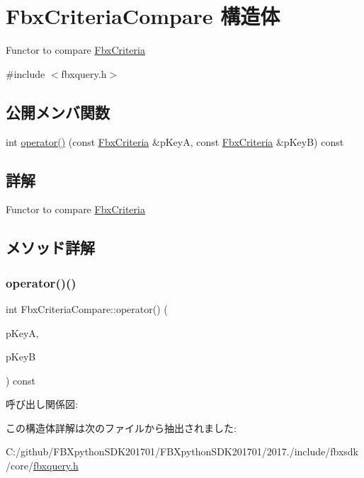 \hypertarget{struct_fbx_criteria_compare}{}\section{Fbx\+Criteria\+Compare 構造体}
\label{struct_fbx_criteria_compare}


Functor to compare \hyperlink{class_fbx_criteria}{Fbx\+Criteria}  




{\ttfamily \#include $<$fbxquery.\+h$>$}

\subsection*{公開メンバ関数}
\begin{DoxyCompactItemize}
\item 
int \hyperlink{struct_fbx_criteria_compare_aa3ea695d11ec64d35f522007960f42b5}{operator()} (const \hyperlink{class_fbx_criteria}{Fbx\+Criteria} \&p\+KeyA, const \hyperlink{class_fbx_criteria}{Fbx\+Criteria} \&p\+KeyB) const
\end{DoxyCompactItemize}


\subsection{詳解}
Functor to compare \hyperlink{class_fbx_criteria}{Fbx\+Criteria} 

\subsection{メソッド詳解}
\mbox{\label{struct_fbx_criteria_compare_aa3ea695d11ec64d35f522007960f42b5}} 
\subsubsection{\texorpdfstring{operator()()}{operator()()}}
{\footnotesize\ttfamily int Fbx\+Criteria\+Compare\+::operator() (\begin{DoxyParamCaption}\item[{const \hyperlink{class_fbx_criteria}{Fbx\+Criteria} \&}]{p\+KeyA,  }\item[{const \hyperlink{class_fbx_criteria}{Fbx\+Criteria} \&}]{p\+KeyB }\end{DoxyParamCaption}) const}

呼び出し関係図\+:


この構造体詳解は次のファイルから抽出されました\+:\begin{DoxyCompactItemize}
\item 
C\+:/github/\+F\+B\+Xpython\+S\+D\+K201701/\+F\+B\+Xpython\+S\+D\+K201701/2017./include/fbxsdk/core/\hyperlink{fbxquery_8h}{fbxquery.\+h}\end{DoxyCompactItemize}
